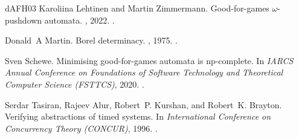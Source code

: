 \documentclass[10pt,a4paper]{amsart}
\theoremstyle{definition}
\numberwithin{equation}{section}
\begin{document}
\begin{thebibliography}{dAFH{\etalchar{+}}03}
Karoliina Lehtinen and Martin Zimmermann.
\newblock Good-for-games $\omega$-pushdown automata.
, 2022.
\newblock \href {https://doi.org/10.46298/lmcs-18(1:3)2022}
  {}.

Donald~A Martin.
\newblock Borel determinacy.
, 1975.
\newblock \href {https://doi.org/10.2307/1971035} {}.

Sven Schewe.
\newblock Minimising good-for-games automata is np-complete.
\newblock In {\em IARCS Annual Conference on Foundations of Software Technology
  and Theoretical Computer Science (FSTTCS)}, 2020.
\newblock \href {https://doi.org/10.4230/LIPIcs.FSTTCS.2020.56}
  {}.

Serdar Tasiran, Rajeev Alur, Robert~P. Kurshan, and Robert~K. Brayton.
\newblock Verifying abstractions of timed systems.
\newblock In {\em International Conference on Concurrency Theory (CONCUR)},
  1996.
\newblock \href {https://doi.org/10.1007/3-540-61604-7_75}
  {}.

\end{thebibliography}
\end{document}
